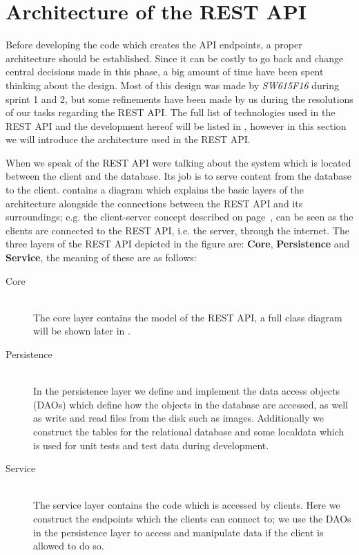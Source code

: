 \section{Architecture of the REST API}
Before developing the code which creates the API endpoints, a proper architecture should be established.
Since it can be costly to go back and change central decisions made in this phase, a big amount of time have been spent thinking about the design.
Most of this design was made by \textit{SW615F16} during sprint 1 and 2, but some refinements have been made by us during the resolutions of our tasks regarding the REST API.
The full list of technologies used in the REST API and the development hereof will be listed in , however in this section we will introduce the architecture used in the REST API.

When we speak of the REST API were talking about the system which is located between the client and the database.
Its job is to serve content from the database to the client.
 contains a diagram which explains the basic layers of the architecture alongside the connections between the REST API and its surroundings; e.g. the client-server concept described on page~\pageref{client-server-rest}, can be seen as the clients are connected to the REST API, i.e. the server, through the internet.
The three layers of the REST API depicted in the figure are: \textbf{Core}, \textbf{Persistence} and \textbf{Service}, the meaning of these are as follows:
\begin{description}
    \item[Core] \hfill \\
    The core layer contains the model of the REST API, a full class diagram will be shown later in .

    \item[Persistence] \hfill \\
    In the persistence layer we define and implement the data access objects (DAOs) which define how the objects in the database are accessed, as well as write and read files from the disk such as images.
    Additionally we construct the tables for the relational database and some localdata which is used for unit tests and test data during development.

    \item[Service] \hfill \\
    The service layer contains the code which is accessed by clients.
    Here we construct the endpoints which the clients can connect to; we use the DAOs in the persistence layer to access and manipulate data if the client is allowed to do so.
\end{description}

